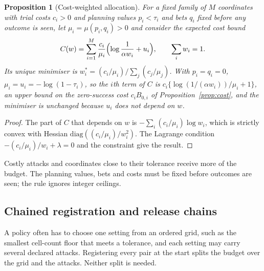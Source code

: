 \documentclass{jpc}
\newtheorem{proposition}[thm]{Proposition}
\theoremstyle{remark}
\begin{document}
\begin{proposition}[Cost-weighted allocation]\label{prop:weights}
For a fixed family of $M$ coordinates with trial costs $c_i>0$ and planning values $p_i<\tau_i$ and bets $q_i$ fixed before any outcome is seen, let $\mu_i=\mu(p_i,q_i)>0$ and consider the expected cost bound
\begin{equation}\label{eq:cost}
C(w)=\sum_{i=1}^M\frac{c_i}{\mu_i}\Bigl(\log\frac1{\alpha w_i}+u_i\Bigr),\qquad\sum_iw_i=1 .
\end{equation}
Its unique minimiser is $w_i^\ast=(c_i/\mu_i)/\sum_j(c_j/\mu_j)$. With $p_i=q_i=0$, $\mu_i=u_i=-\log(1-\tau_i)$, so the $i$th term of $C$ is $c_i\{\log(1/(\alpha w_i))/\mu_i+1\}$, an upper bound on the zero-success cost $c_iB_{0,i}$ of Proposition~\ref{prop:cost}, and the minimiser is unchanged because $u_i$ does not depend on $w$.
\end{proposition}
\begin{proof}
The part of $C$ that depends on $w$ is $-\sum_i(c_i/\mu_i)\log w_i$, which is strictly convex with Hessian $\mathrm{diag}((c_i/\mu_i)/w_i^2)$. The Lagrange condition $-(c_i/\mu_i)/w_i+\lambda=0$ and the constraint give the result.
\end{proof}
Costly attacks and coordinates close to their tolerance receive more of the budget. The planning values, bets and costs must be fixed before outcomes are seen; the rule ignores integer ceilings.

\subsection{Chained registration and release chains}
A policy often has to choose one setting from an ordered grid, such as the smallest cell-count floor that meets a tolerance, and each setting may carry several declared attacks. Registering every pair at the start splits the budget over the grid and the attacks. Neither split is needed.
\end{document}

